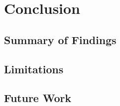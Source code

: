 \chapter{Conclusion}
    \section{Summary of Findings}
    \section{Limitations}
    \section{Future Work}
